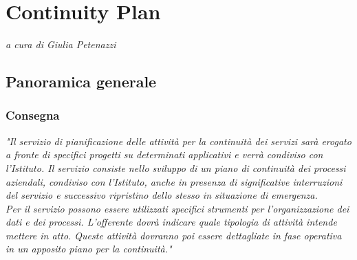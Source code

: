 \chapter{Continuity Plan}
\begin{flushright}
\textit{a cura di \large{Giulia Petenazzi}}
\end{flushright}
\label{cap:continuityplan}














\section{Panoramica generale}
\subsection{Consegna}
\textit{"Il servizio di pianificazione delle attività per la continuità dei servizi sarà erogato a fronte di specifici 
progetti su determinati applicativi e verrà condiviso con l’Istituto.
Il servizio consiste nello sviluppo 
di  un  piano  di  continuità  dei  processi  aziendali,  condiviso  con  l’Istituto,  anche  in  presenza  di 
significative interruzioni del servizio e successivo ripristino dello stesso in situazione di emergenza.
\\Per  il  servizio  possono  essere  utilizzati  specifici  strumenti  per  l’organizzazione  dei  dati  e  dei 
processi. L’offerente dovrà indicare quale tipologia di attività intende mettere in atto. Queste attività 
dovranno poi essere dettagliate in fase operativa in un apposito piano per la continuità."}

